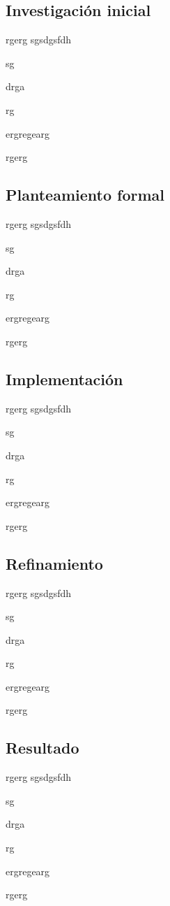 \subsection{Investigación inicial}

rgerg
sgsdgsfdh

sg

drga

rg

ergregearg

rgerg

\subsection{Planteamiento formal}

rgerg
sgsdgsfdh

sg

drga

rg

ergregearg

rgerg

\subsection{Implementación}

rgerg
sgsdgsfdh

sg

drga

rg

ergregearg

rgerg

\subsection{Refinamiento}

rgerg
sgsdgsfdh

sg

drga

rg

ergregearg

rgerg

\subsection{Resultado}

rgerg
sgsdgsfdh

sg

drga

rg

ergregearg

rgerg


